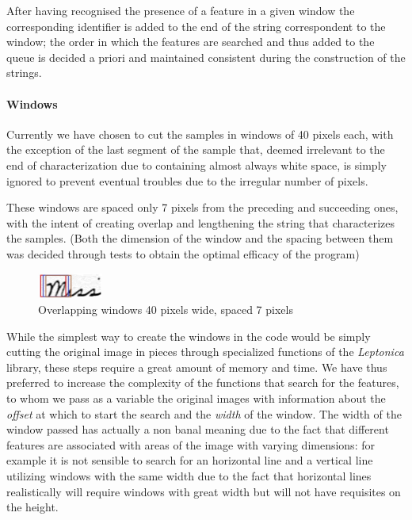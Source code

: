 After having recognised the presence of a feature in a given window the corresponding identifier is added to the end of the string correspondent to the window; the order in which the features are searched and thus added to the queue is decided a priori and maintained consistent during the construction of the strings. 


\paragraph{Windows}

Currently we have chosen to cut the samples in windows of 40 pixels each, with the exception of the last segment of the sample that, deemed irrelevant to the end of characterization due to containing almost always white space, is simply ignored to prevent eventual troubles due to the irregular number of pixels.

These windows are spaced only 7 pixels from the preceding and succeeding ones, with the intent of creating overlap and lengthening the string that characterizes the samples.
(Both the dimension of the window and the spacing between them was decided through tests to obtain the optimal efficacy of the program)

\begin{figure}[!htpb]
\centering
\includegraphics[width=0.19\textwidth]{images/sliding.jpg}
\caption{Overlapping windows 40 pixels wide, spaced 7 pixels}
\end{figure} 



While the simplest way to create the windows in the code would be simply cutting the original image in pieces through specialized functions of the \textit{Leptonica} library, these steps require a great amount of memory and time. We have thus preferred to increase the complexity of the functions that search for the features, to whom we pass as a variable the original images with information about the \textit{offset} at which to start the search and the \textit{width} of the window. The width of the window passed has actually a non banal meaning due to the fact that different features are associated with areas of the image with varying dimensions: for example it is not sensible to search for an horizontal line and a vertical line utilizing windows with the same width due to the fact that horizontal lines realistically will require windows with great width but will not have requisites on the height.


